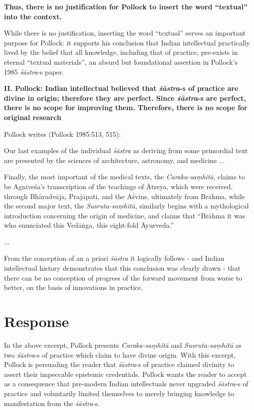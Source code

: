 \textbf{Thus, there is no justification for Pollock to insert the word ``textual'' into the context.}

While there is no justification, inserting the word ``textual'' serves an important purpose for Pollock: it supports his conclusion that Indian intellectual practically lived by the belief that all knowledge, including that of practice, pre-exists in eternal ``textual materials'', an absurd but foundational assertion in Pollock's 1985 {\sl śāstra}-s paper.

\newpage

{\bf II. Pollock: Indian intellectual believed that {{\sl\bfseries śāstra}\relax}-s of practice are divine in origin; therefore they are perfect. Since {{\sl\bfseries śāstra}\relax}-s are perfect, there is no scope for improving them. Therefore, there is no scope for original research}

Pollock writes (Pollock 1985:513, 515):
\begin{myquote}
Our last examples of the individual {\sl śāstra} as deriving from some primordial text are presented by the sciences of architecture, astronomy, and medicine ...

Finally, the most important of the medical texts, the {\sl Caraka-saṃhitā}, claims to be Agniveśa's transcription of the teachings of Ātreya, which were received, through Bhāradvāja, Prajāpati, and the Aśvins, ultimately from Brāhma, while the second major text, the {\sl Susruta-saṃhitā}, similarly begins with a mythological introduction concerning the origin of medicine, and claims that ``Brāhma it was who enunciated this Vedāṅga, this eight-fold Āyurveda.''

...

From the conception of an a priori {\sl śāstra} it logically follows - and Indian intellectual history demonstrates that this conclusion was clearly drawn - that there can be no conception of progress of the forward movement from worse to better, on the basis of innovations in practice. 
\end{myquote}

\section*{Response}

In the above excerpt, Pollock presents {\sl Caraka-saṃhitā} and {\sl Susruta-saṃhitā} as two {\sl śāstra}-s of practice which claim to have divine origin.  With this excerpt, Pollock is persuading the reader that {\sl śāstra}-s of practice claimed divinity to assert their impeccable epistemic credentials. Pollock wants the reader to accept as a consequence that pre-modern Indian intellectuals never upgraded {\sl śāstra}-s of practice and voluntarily limited themselves to merely bringing knowledge to manifestation from the {\sl śāstra}-s.

